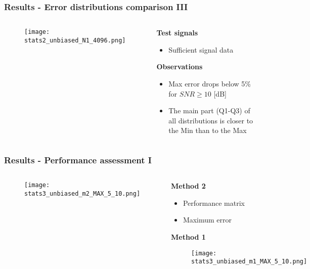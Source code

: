 \documentclass[11pt,aspectratio=169]{beamer}
\begin{document}
	\begin{frame}
		\frametitle{Results - Error distributions comparison III}
		\begin{columns}[t]
			\begin{RIPcolleft}
				\begin{figure}
					\texttt{[image: stats2\_unbiased\_N1\_4096.png]}
				\end{figure}
			\end{RIPcolleft}
			\begin{RIPcolright}
				\textbf{Test signals}\\
				\begin{itemize}
					\item Sufficient signal data
				\end{itemize}
				\textbf{Observations}\\
				\begin{itemize}
					\item Max error drops below 5\% for $SNR \ge 10$ [dB]
					\item The main part (Q1-Q3) of all distributions is closer to the Min than to the Max
				\end{itemize}
			\end{RIPcolright}
		\end{columns}
	\end{frame}
	\begin{frame}
		\frametitle{Results - Performance assessment I}
		\begin{columns}[t]
			\begin{RIPcolleft}
				\begin{figure}
					\texttt{[image: stats3\_unbiased\_m2\_MAX\_5\_10.png]}
				\end{figure}
			\end{RIPcolleft}
			\begin{RIPcolright}
				\textbf{Method 2}\\
				\begin{itemize}
					\item Performance matrix
					\item Maximum error
				\end{itemize}
				\vspace{.5em}
				\textbf{Method 1}\\
				\begin{figure}
					\texttt{[image: stats3\_unbiased\_m1\_MAX\_5\_10.png]}
				\end{figure}
			\end{RIPcolright}
		\end{columns}
	\end{frame}
\end{document}
